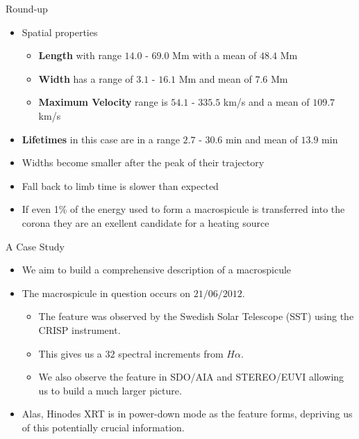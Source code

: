 \documentclass{beamer}
\begin{document}
	\begin{frame}{Round-up}
			\begin{itemize}
				\item Spatial properties
				\begin{itemize}
					\item \textbf{Length} with range $14.0$ - $69.0$ Mm with a mean of $48.4$ Mm
					\item \textbf{Width} has a range of $3.1$ - $16.1$ Mm and mean of $7.6$ Mm
					\item \textbf{Maximum Velocity} range is $54.1$ - $335.5$ km/s and a mean of $109.7$ km/s 
				\end{itemize}
				\item \textbf{Lifetimes} in this case are in a range $2.7$ - $30.6$ min and mean of $13.9$ min
				\item{Widths become smaller after the peak of their trajectory}
				\item{Fall back to limb time is slower than expected}
				\item{If even 1\% of the energy used to form a macrospicule is transferred into the corona they are an exellent candidate for a heating source}
	
			\end{itemize}
	\end{frame}
	
	
	

	\begin{frame}{A Case Study}
		\begin{itemize}
			\item{We aim to build a comprehensive description of a macrospicule}
			\item{The macrospicule in question occurs on $21/06/2012$.}			
			\begin{itemize}
				\item{The feature was observed by the Swedish Solar Telescope (SST) using the CRISP instrument.}
				\item{This gives us a $32$ spectral increments from $H\alpha$.}
				\item{We also observe the feature in SDO/AIA and STEREO/EUVI allowing us to build a much larger picture.}
			\end{itemize}
			\item{Alas, Hinodes XRT is in power-down mode as the feature forms, depriving us of this potentially crucial information.}
		\end{itemize}
	\end{frame}	
	
\end{document}

